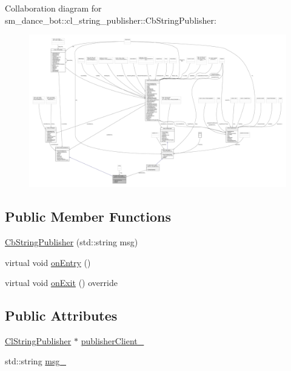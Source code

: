 Collaboration diagram for sm\+\_\+dance\+\_\+bot\+:\+:cl\+\_\+string\+\_\+publisher\+:\+:Cb\+String\+Publisher\+:\nopagebreak
\begin{figure}[H]
\begin{center}
\leavevmode
\includegraphics[width=350pt]{classsm__dance__bot_1_1cl__string__publisher_1_1CbStringPublisher__coll__graph}
\end{center}
\end{figure}
\subsection*{Public Member Functions}
\begin{DoxyCompactItemize}
\item 
\hyperlink{classsm__dance__bot_1_1cl__string__publisher_1_1CbStringPublisher_abe08b99960be5c26acce0cb062ceea5f}{Cb\+String\+Publisher} (std\+::string msg)
\item 
virtual void \hyperlink{classsm__dance__bot_1_1cl__string__publisher_1_1CbStringPublisher_a7aa533578e820ee90d92d15b85d42e9b}{on\+Entry} ()
\item 
virtual void \hyperlink{classsm__dance__bot_1_1cl__string__publisher_1_1CbStringPublisher_ac93cc1eb150140331cb3e560ec8249e2}{on\+Exit} () override
\end{DoxyCompactItemize}
\subsection*{Public Attributes}
\begin{DoxyCompactItemize}
\item 
\hyperlink{classsm__dance__bot_1_1cl__string__publisher_1_1ClStringPublisher}{Cl\+String\+Publisher} $\ast$ \hyperlink{classsm__dance__bot_1_1cl__string__publisher_1_1CbStringPublisher_aafcad6e6296a3088cb91ffeb22025bd6}{publisher\+Client\+\_\+}
\item 
std\+::string \hyperlink{classsm__dance__bot_1_1cl__string__publisher_1_1CbStringPublisher_a320ff6940dc15b469af3679d2d2eb655}{msg\+\_\+}
\end{DoxyCompactItemize}


